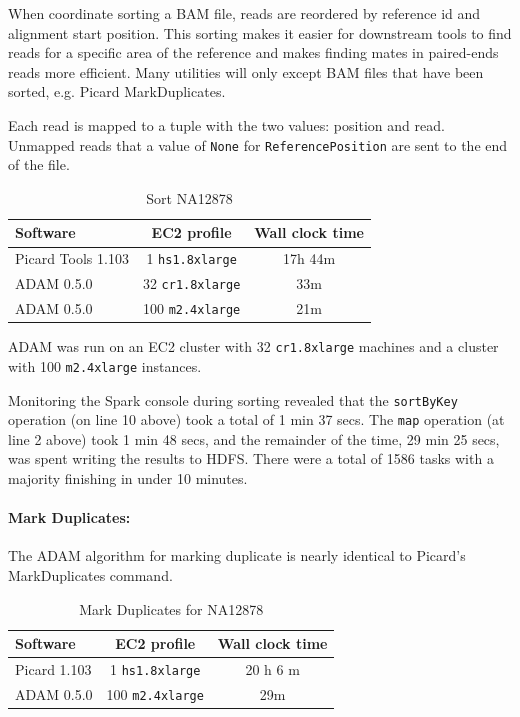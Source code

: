 \documentclass[10pt,twocolumn]{article}
\theoremstyle{plain}
\begin{document}
When coordinate sorting a BAM file, reads are reordered by reference id and alignment start position.
This sorting makes it easier for downstream tools to find reads for a specific area of the reference
and makes finding mates in paired-ends reads more efficient. Many utilities will only except 
BAM files that have been sorted, e.g. Picard MarkDuplicates.

Each read is mapped to a tuple with the two values: position and read.
Unmapped reads that a value of \texttt{None} for \texttt{ReferencePosition}
are sent to the end of the file.

\begin{table}[h]
\caption{Sort NA12878}
\label{tab:time-flagstat}
\begin{scriptsize}
\begin{center}
\begin{tabular}{| l | c | c |}
\hline
\bf Software & \bf EC2 profile & \bf Wall clock time \\
\hline
Picard Tools 1.103 & 1 \texttt{hs1.8xlarge} & 17h 44m \\
ADAM 0.5.0 & 32 \texttt{cr1.8xlarge} & 33m \\
ADAM 0.5.0 & 100 \texttt{m2.4xlarge} & 21m \\
\hline
\end{tabular}
\end{center}
\end{scriptsize}
\end{table}

ADAM was run on an EC2 cluster with 32 \texttt{cr1.8xlarge} machines and
a cluster with 100 \texttt{m2.4xlarge} instances.

Monitoring the Spark console during sorting revealed that the \texttt{sortByKey}
operation (on line 10 above) took a total of 1 min 37 secs. The \texttt{map} operation
(at line 2 above) took 1 min 48 secs, and the remainder of the time, 29 min 25 secs, was 
spent writing the results to HDFS. There were a total of 1586 tasks with a majority
finishing in under 10 minutes.

\paragraph{Mark Duplicates:}
\label{sec:mark-duplicates}

The ADAM algorithm for marking duplicate is nearly identical to Picard's MarkDuplicates
command. 

\begin{table}[h]
\caption{Mark Duplicates for NA12878}
\label{tab:time-mark-duplicates}
\begin{scriptsize}
\begin{center}
\begin{tabular}{| l | c | c |}
\hline
\bf Software & \bf EC2 profile & \bf Wall clock time \\
\hline
Picard 1.103 & 1 \texttt{hs1.8xlarge} & 20 h 6 m \\
ADAM 0.5.0 & 100 \texttt{m2.4xlarge} & 29m \\
\hline
\end{tabular}
\end{center}
\end{scriptsize}
\end{table}
\end{document}
